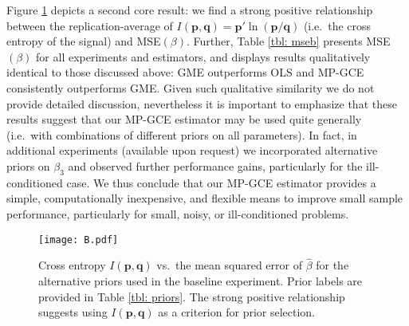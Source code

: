 \documentclass{elsarticle}
\begin{document}
Figure \ref{fig: B} depicts a second core result: we find a strong positive 
relationship between the replication-average of $I(\mathbf{p}, \mathbf{q}) = 
\mathbf{p}'\ln (\mathbf{p}/\mathbf{q})$ (i.e.\ the cross entropy of the signal) 
and MSE$(\beta)$.
Further, Table \ref{tbl: mseb} presents MSE$(\beta)$ for all experiments and 
estimators, and displays results qualitatively identical to those discussed above:
GME outperforms OLS and MP-GCE consistently outperforms GME.
Given such qualitative similarity we do not provide detailed discussion, 
nevertheless it is important to emphasize that these results suggest that our 
MP-GCE estimator may be used quite generally (i.e.\ with combinations of 
different priors on all parameters).
In fact, in additional experiments (available upon request) we incorporated 
alternative priors on $\beta_3$ and observed further performance gains,
particularly for the ill-conditioned case.
We thus conclude that our MP-GCE estimator provides a simple, 
computationally inexpensive, and flexible means to improve small sample 
performance, particularly for small, noisy, or ill-conditioned problems.

\begin{figure}[htbp]
\centering
\texttt{[image: B.pdf]}
\caption{Cross entropy $I(\mathbf{p}, \mathbf{q})$ vs.\  the mean squared
error of $\hat{\beta}$ for the alternative priors used in the baseline experiment.
Prior labels are provided in Table \ref{tbl: priors}.
The strong positive relationship suggests using $I(\mathbf{p}, \mathbf{q})$
as a criterion for prior selection.}
\label{fig: B}
\end{figure}

\footnotesize
{}
\normalsize
\end{document}
